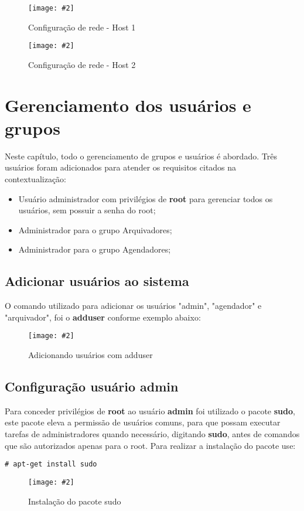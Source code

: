 \documentclass[
	12pt,				%
	openany,			%
	a4paper,			%
	chapter=TITLE,		%
	section=TITLE,		%
	english,
	brazil				%
]{abntex2}
\newcommand{\includeImage}[3] {

\begin{figure}[H]
 	 \centering
  		\texttt{[image: \#2]}
  	\caption{#3}
\end{figure}

}
\begin{document}
\includeImage{0.5}{imgs/2_configuracao_rede/host/1_host_1.png}{Configuração de rede - Host 1}
\includeImage{0.5}{imgs/2_configuracao_rede/host/1_host_2.png}{Configuração de rede - Host 2}

\section{Gerenciamento dos usuários e grupos}

Neste capítulo, todo o gerenciamento de grupos e usuários é abordado. Três usuários foram adicionados para atender os requisitos citados na contextualização:

\begin{itemize}
	\item Usuário administrador com privilégios de \textbf{root} para gerenciar todos os usuários, sem possuir a senha do root;
	\item Administrador para o grupo Arquivadores;
	\item Administrador para o grupo Agendadores;
\end{itemize}

\subsection {Adicionar usuários ao sistema}
O comando utilizado para adicionar os usuários "admin", "agendador" e "arquivador", foi o \textbf{adduser} conforme exemplo abaixo:

\includeImage{0.7}{imgs/5_gerenciamento_grupos/adduser_exemplo.png}{Adicionando usuários com adduser}


\subsection{Configuração usuário admin}
Para conceder privilégios de \textbf{root} ao usuário \textbf{admin} foi utilizado o pacote \textbf{sudo}, este pacote eleva a permissão de usuários comuns, para que possam executar tarefas de administradores quando necessário, digitando \textbf{sudo}, antes de comandos que são autorizados apenas para o root. Para realizar a instalação do pacote use:

\begin{lstlisting}
# apt-get install sudo
\end{lstlisting}

\includeImage{0.7}{imgs/5_gerenciamento_grupos/instalando_sudo.png}{Instalação do pacote sudo}
\end{document}
